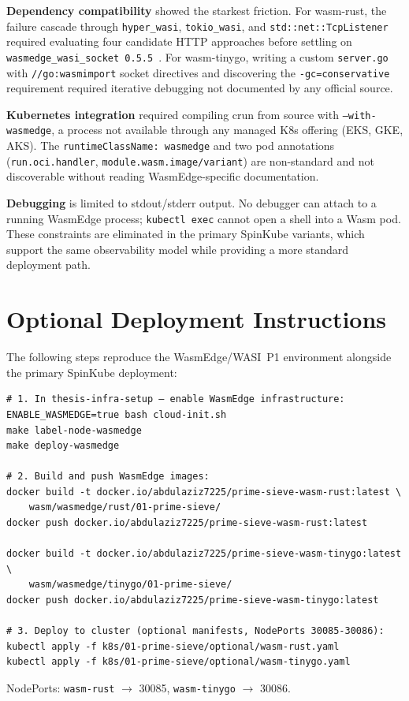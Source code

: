 \textbf{Dependency compatibility} showed the starkest friction. For wasm-rust, the failure cascade through \texttt{hyper\_wasi}, \texttt{tokio\_wasi}, and \texttt{std::net::TcpListener} required evaluating four candidate \acs{HTTP} approaches before settling on \texttt{wasmedge\_wasi\_socket~0.5.5}~\cite{wasmedgewasisocket}. For wasm-tinygo, writing a custom \texttt{server.go} with \texttt{//go:wasmimport} socket directives and discovering the \texttt{-gc=conservative} requirement required iterative debugging not documented by any official source.

\textbf{Kubernetes integration} required compiling crun from source with \texttt{--with-wasmedge}, a process not available through any managed \acs{K8s} offering (EKS, GKE, AKS). The \texttt{runtimeClassName: wasmedge} and two pod annotations (\texttt{run.oci.handler}, \texttt{module.wasm.image/variant}) are non-standard and not discoverable without reading \acs{WasmEdge}-specific documentation.

\textbf{Debugging} is limited to stdout/stderr output. No debugger can attach to a running \acs{WasmEdge} process; \texttt{kubectl exec} cannot open a shell into a \acs{Wasm} pod. These constraints are eliminated in the primary SpinKube variants, which support the same observability model while providing a more standard deployment path.

\section{Optional Deployment Instructions}
\label{app:wasmedge_deploy}

The following steps reproduce the WasmEdge/\acs{WASI}~P1 environment alongside the primary SpinKube deployment:

\begin{verbatim}
# 1. In thesis-infra-setup — enable WasmEdge infrastructure:
ENABLE_WASMEDGE=true bash cloud-init.sh
make label-node-wasmedge
make deploy-wasmedge

# 2. Build and push WasmEdge images:
docker build -t docker.io/abdulaziz7225/prime-sieve-wasm-rust:latest \
    wasm/wasmedge/rust/01-prime-sieve/
docker push docker.io/abdulaziz7225/prime-sieve-wasm-rust:latest

docker build -t docker.io/abdulaziz7225/prime-sieve-wasm-tinygo:latest \
    wasm/wasmedge/tinygo/01-prime-sieve/
docker push docker.io/abdulaziz7225/prime-sieve-wasm-tinygo:latest

# 3. Deploy to cluster (optional manifests, NodePorts 30085-30086):
kubectl apply -f k8s/01-prime-sieve/optional/wasm-rust.yaml
kubectl apply -f k8s/01-prime-sieve/optional/wasm-tinygo.yaml
\end{verbatim}

NodePorts: \texttt{wasm-rust} $\to$ 30085, \texttt{wasm-tinygo} $\to$ 30086.
